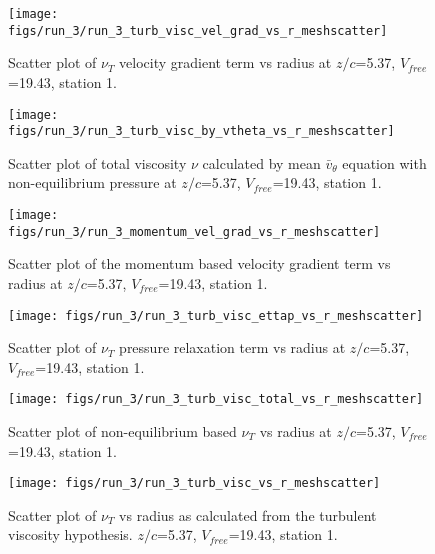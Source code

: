 \begin{figure}[H]
\centering
\texttt{[image: figs/run\_3/run\_3\_turb\_visc\_vel\_grad\_vs\_r\_meshscatter]}
\caption{Scatter plot of $\nu_T$ velocity gradient term vs radius at $z/c$=5.37, $V_{free}$=19.43, station 1.}
\end{figure}


\begin{figure}[H]
\centering
\texttt{[image: figs/run\_3/run\_3\_turb\_visc\_by\_vtheta\_vs\_r\_meshscatter]}
\caption{Scatter plot of total viscosity $\nu$ calculated by mean $\bar{v}_{\theta}$ equation with non-equilibrium pressure at $z/c$=5.37, $V_{free}$=19.43, station 1.}
\end{figure}


\begin{figure}[H]
\centering
\texttt{[image: figs/run\_3/run\_3\_momentum\_vel\_grad\_vs\_r\_meshscatter]}
\caption{Scatter plot of the momentum based velocity gradient term vs radius at $z/c$=5.37, $V_{free}$=19.43, station 1.}
\end{figure}


\begin{figure}[H]
\centering
\texttt{[image: figs/run\_3/run\_3\_turb\_visc\_ettap\_vs\_r\_meshscatter]}
\caption{Scatter plot of $\nu_T$ pressure relaxation term vs radius at $z/c$=5.37, $V_{free}$=19.43, station 1.}
\end{figure}


\begin{figure}[H]
\centering
\texttt{[image: figs/run\_3/run\_3\_turb\_visc\_total\_vs\_r\_meshscatter]}
\caption{Scatter plot of non-equilibrium based $\nu_T$ vs radius at $z/c$=5.37, $V_{free}$=19.43, station 1.}
\end{figure}


\begin{figure}[H]
\centering
\texttt{[image: figs/run\_3/run\_3\_turb\_visc\_vs\_r\_meshscatter]}
\caption{Scatter plot of $\nu_T$ vs radius as calculated from the turbulent viscosity hypothesis. $z/c$=5.37, $V_{free}$=19.43, station 1.}
\end{figure}


